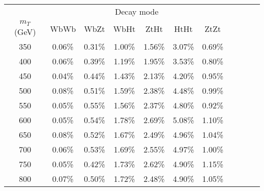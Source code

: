 \begin{tabular}{c c c c c c c c c c c } \toprule
 & \multicolumn{6}{c}{ Decay mode } \\
 $m_{T}$ (GeV)  & WbWb 		 & WbZt 		 & WbHt 		 & ZtHt 		 & HtHt 		 & ZtZt 		 \\ \midrule 
 350 & 0.06\% & 0.31\% & 1.00\% & 1.56\% & 3.07\% & 0.69\%\\ 
400 & 0.06\% & 0.39\% & 1.19\% & 1.95\% & 3.53\% & 0.80\%\\ 
450 & 0.04\% & 0.44\% & 1.43\% & 2.13\% & 4.20\% & 0.95\%\\ 
500 & 0.08\% & 0.51\% & 1.59\% & 2.38\% & 4.48\% & 0.99\%\\ 
550 & 0.05\% & 0.55\% & 1.56\% & 2.37\% & 4.80\% & 0.92\%\\ 
600 & 0.05\% & 0.54\% & 1.78\% & 2.69\% & 5.08\% & 1.10\%\\ 
650 & 0.08\% & 0.52\% & 1.67\% & 2.49\% & 4.96\% & 1.04\%\\ 
700 & 0.06\% & 0.53\% & 1.69\% & 2.55\% & 4.97\% & 1.00\%\\ 
750 & 0.05\% & 0.42\% & 1.73\% & 2.62\% & 4.90\% & 1.15\%\\ 
800 & 0.07\% & 0.50\% & 1.72\% & 2.48\% & 4.90\% & 1.05\%\\ 
\bottomrule\end{tabular}